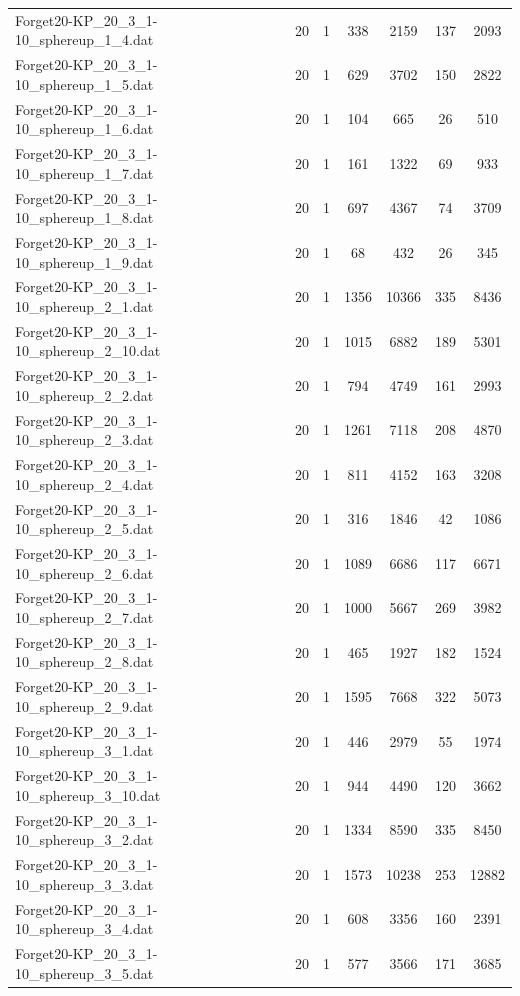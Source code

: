 \begin{table}[!ht]
\begin{tabular}{lcccccc}
Forget20-KP\_20\_3\_1-10\_sphereup\_1\_4.dat & 20 & 1 & 338 & 2159 & 137 & 2093 \\
Forget20-KP\_20\_3\_1-10\_sphereup\_1\_5.dat & 20 & 1 & 629 & 3702 & 150 & 2822 \\
Forget20-KP\_20\_3\_1-10\_sphereup\_1\_6.dat & 20 & 1 & 104 & 665 & 26 & 510 \\
Forget20-KP\_20\_3\_1-10\_sphereup\_1\_7.dat & 20 & 1 & 161 & 1322 & 69 & 933 \\
Forget20-KP\_20\_3\_1-10\_sphereup\_1\_8.dat & 20 & 1 & 697 & 4367 & 74 & 3709 \\
Forget20-KP\_20\_3\_1-10\_sphereup\_1\_9.dat & 20 & 1 & 68 & 432 & 26 & 345 \\
Forget20-KP\_20\_3\_1-10\_sphereup\_2\_1.dat & 20 & 1 & 1356 & 10366 & 335 & 8436 \\
Forget20-KP\_20\_3\_1-10\_sphereup\_2\_10.dat & 20 & 1 & 1015 & 6882 & 189 & 5301 \\
Forget20-KP\_20\_3\_1-10\_sphereup\_2\_2.dat & 20 & 1 & 794 & 4749 & 161 & 2993 \\
Forget20-KP\_20\_3\_1-10\_sphereup\_2\_3.dat & 20 & 1 & 1261 & 7118 & 208 & 4870 \\
Forget20-KP\_20\_3\_1-10\_sphereup\_2\_4.dat & 20 & 1 & 811 & 4152 & 163 & 3208 \\
Forget20-KP\_20\_3\_1-10\_sphereup\_2\_5.dat & 20 & 1 & 316 & 1846 & 42 & 1086 \\
Forget20-KP\_20\_3\_1-10\_sphereup\_2\_6.dat & 20 & 1 & 1089 & 6686 & 117 & 6671 \\
Forget20-KP\_20\_3\_1-10\_sphereup\_2\_7.dat & 20 & 1 & 1000 & 5667 & 269 & 3982 \\
Forget20-KP\_20\_3\_1-10\_sphereup\_2\_8.dat & 20 & 1 & 465 & 1927 & 182 & 1524 \\
Forget20-KP\_20\_3\_1-10\_sphereup\_2\_9.dat & 20 & 1 & 1595 & 7668 & 322 & 5073 \\
Forget20-KP\_20\_3\_1-10\_sphereup\_3\_1.dat & 20 & 1 & 446 & 2979 & 55 & 1974 \\
Forget20-KP\_20\_3\_1-10\_sphereup\_3\_10.dat & 20 & 1 & 944 & 4490 & 120 & 3662 \\
Forget20-KP\_20\_3\_1-10\_sphereup\_3\_2.dat & 20 & 1 & 1334 & 8590 & 335 & 8450 \\
Forget20-KP\_20\_3\_1-10\_sphereup\_3\_3.dat & 20 & 1 & 1573 & 10238 & 253 & 12882 \\
Forget20-KP\_20\_3\_1-10\_sphereup\_3\_4.dat & 20 & 1 & 608 & 3356 & 160 & 2391 \\
Forget20-KP\_20\_3\_1-10\_sphereup\_3\_5.dat & 20 & 1 & 577 & 3566 & 171 & 3685 \\

\end{tabular}
\end{table}
